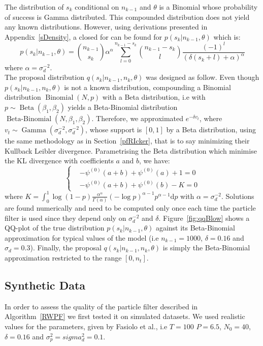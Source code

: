 \documentclass[12pt]{article}
\begin{document}
	The distribution of $s_k$ conditional on $n_{k-1}$ and $\theta$ is a Binomial whose probability of success is Gamma distributed. This compounded distribution does not yield any known distributions. However, using derivations presented in Appendix~\cref{sDensity}, a closed for can be found for $p(s_k|n_{k-1}, \theta)$ which is:
	\begin{equation*}
	p(s_k|n_{k-1}, \theta) = \binom{n_{k-1}}{s_k}\alpha^\alpha\sum_{l=0}^{n_{k-1}-s_k}\binom{n_{k-1}-s_k}{l}\frac{(-1)^l}{(\delta(s_k+l)+\alpha)^\alpha}
	\end{equation*}
	where $\alpha = \sigma_d^{-2}$. \\
	
	The proposal distribution $q(s_k|n_{k-1}, n_k, \theta)$ was designed as follow. Even though $p(s_k|n_{k-1}, n_k, \theta)$ is not a known distribution, compounding a Binomial distribution $\operatorname{Binomial}(N, p)$ with a Beta distribution, i.e with $p \sim \operatorname{Beta}(\beta_1,  \beta_2)$ yields a Beta-Binomial distribution $\operatorname{Beta-Binomial}(N, \beta_1, \beta_2)$. Therefore, we approximated $e^{-\delta v_t}$, where $v_t \sim \operatorname{Gamma}(\sigma_d^{-2}, \sigma_d^{-2})$, whose support is $[0, 1]$ by a Beta distribution, using the same methodology as in Section~\ref{pfRIcker}, that is to say minimizing their Kullback Leibler divergence. Parametrising the Beta distribution which minimise the KL divergence with coefficients $a$ and $b$, we have:
	\[	\begin{cases}
	& -\psi^{(0)}(a+b) + \psi^{(0)}(a) + 1 = 0 \\
	& -\psi^{(0)}(a+b) + \psi^{(0)}(b) - K  = 0
	\end{cases}\]
	where $K=\int_{0}^{1}\log(1-p)\frac{\alpha^\alpha}{\Gamma(\alpha)}(-\log p)^{\alpha-1}p^{\alpha-1}\mathrm{d}p$ with $\alpha = \sigma_d^{-2}$. Solutions are found numerically and need to be computed only once each time the particle filter is used since they depend only on $\sigma_d^{-2}$ and $\delta$. Figure~\ref{fig:qqBlow} shows a QQ-plot of the true distribution $p(s_k|n_{k-1}, \theta)$ against its Beta-Binomial approximation for typical values of the model (i.e $n_{k-1} = 1000$, $\delta=0.16$ and $\sigma_d=0.3$). Finally, the proposal $q(s_k|n_{k-1}, n_k, \theta)$ is simply the Beta-Binomial approximation restricted to the range $[0, n_t]$.
	
	\subsection{Synthetic Data}
	In order to assess the quality of the particle filter described in Algorithm~\ref{RWPF} we first tested it on simulated datasets. We used realistic values for the parameters, given by Fasiolo et al.\cite{fasiolo2014statistical}, i.e $T=100$ $P=6.5$, $N_0=40$, $\delta=0.16$ and $\sigma_p^2=sigma_d^2=0.1$.
	
\end{document}
